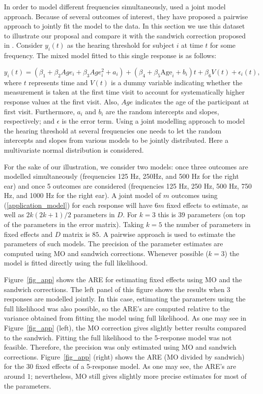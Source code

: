 \documentclass[11pt,a5paper,twoside]{book}
\begin{document}
In order to model different frequencies simultaneously, \cite{Verbeke2006} used a joint model approach. Because of several outcomes of interest, they have proposed a pairwise approach to jointly fit the model to the data. In this section we use this dataset to illustrate our proposal and compare it with the sandwich correction proposed in \cite{Verbeke2006}. Consider $y_i(t)$ as the hearing threshold for subject $i$ at time $t$ for some frequency. The mixed model fitted to this single response is as follows:

\begin{equation}
\label{application_model}
y_i(t)=(\beta_1 +\beta_2 Age_i + \beta_3 Age_i^2 + a_i) + (\beta_4 + \beta_5 \mathrm{Age}_i + b_i)t + \beta_6 V(t) + \epsilon_i(t),
\end{equation}
where $t$ represents time and $V(t)$ is a dummy variable indicating whether the measurement is taken at the first time visit to account for systematically higher response values at the first visit. Also, $Age$ indicates the age of the participant at first visit. Furthermore, $a_i$ and $b_i$ are the random intercepts and slopes, respectively; and $\epsilon$ is the error term. Using a joint modelling approach to model the hearing threshold at several frequencies one needs to let the random intercepts and slopes from various models to be jointly distributed. Here a multivariate normal distribution is considered.

For the sake of our illustration, we consider two models: once three outcomes are modelled simultaneously (frequencies 125 Hz, 250Hz, and 500 Hz for the right ear) and once 5 outcomes are considered (frequencies 125 Hz, 250 Hz, 500 Hz, 750 Hz, and 1000 Hz for the right ear). A joint model of $m$ outcomes using (\ref{application_model}) for each response will have $6m$ fixed effects to estimate, as well as $2k (2k+1)/2$ parameters in $D$. For $k=3$ this is 39 parameters (on top of the parameters in the error matrix). Taking $k=5$ the number of parameters in fixed effects and $D$ matrix is $85$. A pairwise approach is used to estimate the parameters of such models. The precision of the parameter estimates are computed using MO and sandwich corrections. Whenever possible ($k=3$) the model is fitted directly using the full likelihood. 

Figure~\ref{fig_app} shows the ARE for estimating fixed effects using MO and the sandwich corrections. The left panel of this figure shows the results when $3$ responses are modelled jointly. In this case, estimating the parameters using the full likelihood was also possible, so the ARE's are computed relative to the variance obtained from fitting the model using full likelihood. As one may see in Figure~\ref{fig_app} (left), the MO correction gives slightly better results compared to the sandwich. Fitting the full likelihood to the 5-response model was not feasible. Therefore, the precision was only estimated using MO and sandwich corrections. Figure~\ref{fig_app} (right) shows the ARE (MO divided by sandwich) for the $30$ fixed effects of a 5-response model. As one may see, the ARE's are around $1$; nevertheless, MO still gives slightly more precise estimates for most of the parameters.
\end{document}

